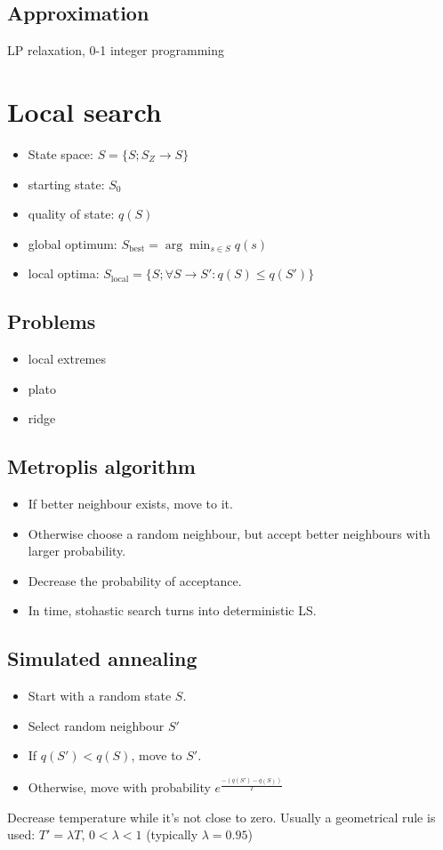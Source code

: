 \begin{multicols}{5}
\subsection{Approximation}
LP relaxation, 0-1 integer programming
\section{Local search}
\begin{itemize}
	\item State space: $S=\{S;S_Z\longrightarrow S\}$
	\item starting state: $S_0$
	\item quality of state: $q(S)$
	\item global optimum: $S_{\text{best}} = \arg \min_{s\in S} q(s)$
	\item local optima: $S_{\text{local}} = \{S;\forall S\rightarrow S\prime : q(S) \leq q(S\prime)\}$
\end{itemize}
\subsection{Problems}
\begin{itemize}
	\item local extremes
	\item plato
	\item ridge
\end{itemize}
\subsection{Metroplis algorithm}
\begin{itemize}
	\item If better neighbour exists, move to it.
	\item Otherwise choose a random neighbour, but accept better neighbours with larger probability.
	\item Decrease the probability of acceptance.
	\item In time, stohastic search turns into deterministic LS.
\end{itemize}
\subsection{Simulated annealing}
\begin{itemize}
	\item Start with a random state $S$.
	\item Select random neighbour $S\prime$
	\item If $q(S\prime) < q(S)$, move to $S\prime$.
	\item Otherwise, move with probability $e^\frac{-(q(S\prime)-q(S))}{T}$
\end{itemize}
Decrease temperature while it's not close to zero.
Usually a geometrical rule is used: $T\prime = \lambda T$, $0<\lambda<1$ (typically $\lambda = 0.95$)

\end{multicols}
